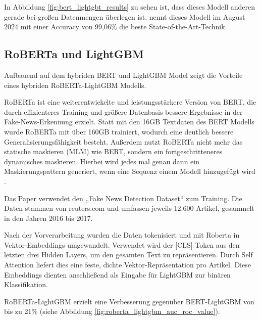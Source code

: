 In Abbildung \ref{fig:bert_lightgbt_results} zu sehen ist, dass dieses Modell anderen gerade bei großen Datenmengen überlegen ist.
\cite{Dhiman:2024aa} nennt dieses Modell im August 2024 mit einer Accuracy von 99,06\% die beste State-of-the-Art-Technik.


\subsection{RoBERTa und LightGBM}
\label{sec:roberta_lightgbm}

Aufbauend auf dem hybriden BERT und LightGBM Model zeigt \cite{V_G_2024} die Vorteile eines hybriden RoBERTa-LightGBM Modells.

RoBERTa ist eine weiterentwickelte und leistungsstärkere Version von BERT, die durch effizienteres Training und größere Datenbasis 
bessere Ergebnisse in der Fake-News-Erkennung erzielt. 
Statt mit den 16GB Textdaten des BERT Modells wurde RoBERTa mit über 160GB trainiert, wodurch eine deutlich bessere Generalisierungsfähigkeit besteht.
Außerdem nutzt RoBERTa nicht mehr das statische maskieren (MLM) wie BERT, sondern ein fortgeschritteneres dynamisches maskieren.
Hierbei wird jedes mal genau dann ein Maskierungspattern generiert, wenn eine Sequenz einem Modell hinzugefügt wird \cite{roberta:main}.

Das Paper verwendet den „Fake News Detection Dataset“ zum Training. 
Die Daten stammen von reuters.com und umfassen jeweils 12.600 Artikel, gesammelt in den Jahren 2016 bis 2017.

Nach der Vorverarbeitung wurden die Daten tokenisiert und mit Roberta in Vektor-Embeddings umgewandelt.
Verwendet wird der [CLS] Token aus den letzten drei Hidden Layers, um den gesamten Text zu repräsentieren.
Durch Self Attention liefert dies eine feste, dichte Vektor-Repräsentation pro Artikel.
Diese Embeddings dienten anschließend als Eingabe für LightGBM zur binären Klassifikation.

RoBERTa-LightGBM erzielt eine Verbesserung gegenüber BERT-LightGBM von bis zu 21\% (siehe Abbildung \ref{fig:roberta_lightgbm_auc_roc_value}).

